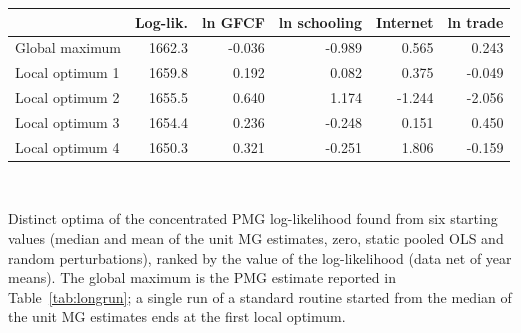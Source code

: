 \begin{tabular}{lrrrrr}\toprule
 & Log-lik. & ln GFCF & ln schooling & Internet & ln trade \\
\midrule
Global maximum & 1662.3 & -0.036 & -0.989 & 0.565 & 0.243 \\
Local optimum 1 & 1659.8 & 0.192 & 0.082 & 0.375 & -0.049 \\
Local optimum 2 & 1655.5 & 0.640 & 1.174 & -1.244 & -2.056 \\
Local optimum 3 & 1654.4 & 0.236 & -0.248 & 0.151 & 0.450 \\
Local optimum 4 & 1650.3 & 0.321 & -0.251 & 1.806 & -0.159 \\
\bottomrule\end{tabular}
\\[3pt]\begin{minipage}{\tablewidth}\footnotesize Distinct optima of the concentrated PMG log-likelihood found from six starting values (median and mean of the unit MG estimates, zero, static pooled OLS and random perturbations), ranked by the value of the log-likelihood (data net of year means). The global maximum is the PMG estimate reported in Table~\ref{tab:longrun}; a single run of a standard routine started from the median of the unit MG estimates ends at the first local optimum.\end{minipage}
